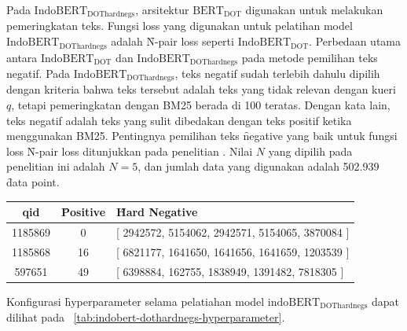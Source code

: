 Pada $\text{IndoBERT}_\text{DOThardnegs}$, arsitektur $\text{BERT}_\text{DOT}$ digunakan untuk melakukan pemeringkatan teks. Fungsi loss yang digunakan untuk pelatihan model $\text{IndoBERT}_{\text{DOThardnegs}}$ adalah \f{N-pair loss} seperti $\text{IndoBERT}_{\text{DOT}}$. Perbedaan utama antara $\text{IndoBERT}_{\text{DOT}}$ dan $\text{IndoBERT}_{\text{DOThardnegs}}$ pada metode pemilihan teks negatif. Pada $\text{IndoBERT}_{\text{DOThardnegs}}$, teks negatif sudah terlebih dahulu dipilih dengan kriteria bahwa teks tersebut adalah teks yang tidak relevan dengan kueri $q$, tetapi pemeringkatan dengan BM25 berada di 100 teratas. Dengan kata lain, teks negatif adalah teks yang sulit dibedakan dengan teks positif ketika menggunakan BM25. Pentingnya pemilihan teks \f{negative} yang baik untuk fungsi loss \f{N-pair loss} ditunjukkan pada penelitian \cite{ANCE,RocketQA}. Nilai $N$ yang dipilih pada penelitian ini adalah $N=5$, dan jumlah data yang digunakan adalah 502.939 \f{data point}.

\begin{table}
    \centering
    \label{tab:hardnegsbm25}
    \begin{tabular}{|c|c|p{8cm}|}
        \hline
        qid & \f{Positive} & \f{Hard Negative}                                           \\
        \hline
        1185869 &  0  & [ 2942572, 5154062, 2942571, 5154065, 3870084 ] \\
        \hline
        1185868 &  16  & [ 6821177, 1641650, 1641656, 1641659, 1203539 ] \\
        \hline
        597651 &  49  & [ 6398884, 162755, 1838949, 1391482, 7818305 ] \\
        \hline
    \end{tabular}
\end{table}


Konfigurasi \f{hyperparameter} selama pelatiahan model $\text{indoBERT}_{\text{DOThardnegs}}$ dapat  dilihat pada \tab~\ref{tab:indobert-dothardnegs-hyperparameter}.


